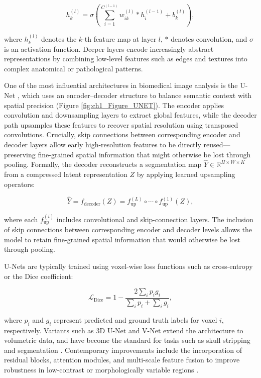 \begin{equation}
    h^{(l)}_k = \sigma\left( \sum_{i=1}^{C^{(l-1)}} w^{(l)}_{ik} * h^{(l-1)}_i + b^{(l)}_k \right),
\end{equation}

where $h^{(l)}_k$ denotes the \(k\)-th feature map at layer \(l\), $*$ denotes convolution, and \(\sigma\) is an activation function. Deeper layers encode increasingly abstract representations by combining low-level features such as edges and textures into complex anatomical or pathological patterns.

One of the most influential architectures in biomedical image analysis is the U-Net \cite{Ronneberger2015-xm}, which uses an encoder–decoder structure to balance semantic context with spatial precision (Figure \ref{fig:ch1_Figure_UNET}). The encoder applies convolution and downsampling layers to extract global features, while the decoder path upsamples these features to recover spatial resolution using transposed convolutions. Crucially, skip connections between corresponding encoder and decoder layers allow early high-resolution features to be directly reused—preserving fine-grained spatial information that might otherwise be lost through pooling. Formally, the decoder reconstructs a segmentation map $\hat{Y} \in \mathbb{R}^{H \times W \times K}$ from a compressed latent representation $Z$ by applying learned upsampling operators:

\begin{equation}
    \hat{Y} = f_{\text{decoder}}(Z) = f^{(L)}_{\text{up}} \circ \cdots \circ f^{(1)}_{\text{up}}(Z),
\end{equation}

where each $f^{(i)}_{\text{up}}$ includes convolutional and skip-connection layers. The inclusion of skip connections between corresponding encoder and decoder levels allows the model to retain fine-grained spatial information that would otherwise be lost through pooling.

U-Nets are typically trained using voxel-wise loss functions such as cross-entropy or the Dice coefficient:

\begin{equation}
    \mathcal{L}_{\text{Dice}} = 1 - \frac{2 \sum_i p_i g_i}{\sum_i p_i + \sum_i g_i},
\end{equation}

where $p_i$ and $g_i$ represent predicted and ground truth labels for voxel $i$, respectively. Variants such as 3D U-Net \cite{Cicek2016-dz} and V-Net \cite{Milletari2016-ra} extend the architecture to volumetric data, and have become the standard for tasks such as skull stripping \cite{Hoopes2022-al} and segmentation \cite{Billot2023-tl, DeKraker2022-gj}. Contemporary improvements include the incorporation of residual blocks, attention modules, and multi-scale feature fusion to improve robustness in low-contrast or morphologically variable regions \cite{Oktay2018-rh}. 

